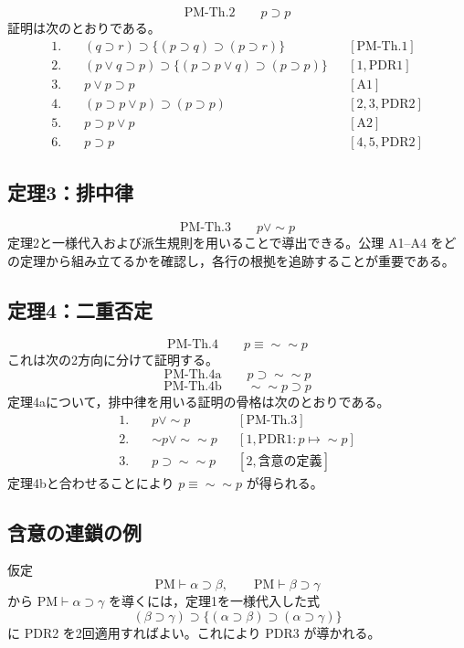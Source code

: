 \documentclass[../main.tex]{subfiles}
\begin{document}
\[
  \mathrm{PM\text{-}Th.2}
  \qquad
  p\supset p
\]
証明は次のとおりである。
\begin{align*}
  1.\quad &
  (q\supset r)
  \supset
  \{(p\supset q)\supset(p\supset r)\}
  &&[\mathrm{PM\text{-}Th.1}]\\
  2.\quad &
  (p\lor q\supset p)
  \supset
  \{(p\supset p\lor q)\supset(p\supset p)\}
  &&[1,\mathrm{PDR1}]\\
  3.\quad &
  p\lor p\supset p
  &&[\mathrm{A1}]\\
  4.\quad &
  (p\supset p\lor p)\supset(p\supset p)
  &&[2,3,\mathrm{PDR2}]\\
  5.\quad &
  p\supset p\lor p
  &&[\mathrm{A2}]\\
  6.\quad &
  p\supset p
  &&[4,5,\mathrm{PDR2}]
\end{align*}

\subsection{定理3：排中律}

\[
  \mathrm{PM\text{-}Th.3}
  \qquad
  p\lor\sim p
\]
定理2と一様代入および派生規則を用いることで導出できる。公理 A1--A4 をどの定理から組み立てるかを確認し，各行の根拠を追跡することが重要である。

\subsection{定理4：二重否定}

\[
  \mathrm{PM\text{-}Th.4}
  \qquad
  p\equiv\sim\sim p
\]
これは次の2方向に分けて証明する。
\[
  \mathrm{PM\text{-}Th.4a}
  \qquad
  p\supset\sim\sim p
\]
\[
  \mathrm{PM\text{-}Th.4b}
  \qquad
  \sim\sim p\supset p
\]
定理4aについて，排中律を用いる証明の骨格は次のとおりである。
\begin{align*}
  1.\quad & p\lor\sim p
  &&[\mathrm{PM\text{-}Th.3}]\\
  2.\quad & \sim p\lor\sim\sim p
  &&[1,\mathrm{PDR1}:p\mapsto\sim p]\\
  3.\quad & p\supset\sim\sim p
  &&[2,\text{含意の定義}]
\end{align*}
定理4bと合わせることにより \(p\equiv\sim\sim p\) が得られる。

\subsection{含意の連鎖の例}

仮定
\[
  \mathrm{PM}\vdash\alpha\supset\beta,
  \qquad
  \mathrm{PM}\vdash\beta\supset\gamma
\]
から \(\mathrm{PM}\vdash\alpha\supset\gamma\) を導くには，定理1を一様代入した式
\[
  (\beta\supset\gamma)
  \supset
  \{(\alpha\supset\beta)\supset(\alpha\supset\gamma)\}
\]
に PDR2 を2回適用すればよい。これにより PDR3 が導かれる。
\end{document}
